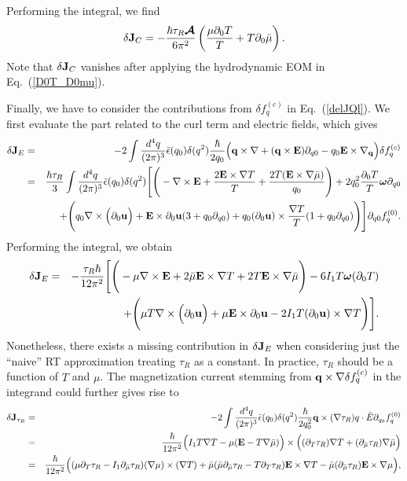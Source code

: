 \documentclass[aps,prd,showkeys,preprint,amsmath,amssymb,nofootinbib]{revtex4-1}
\begin{document}
Performing the integral, we find
\begin{eqnarray}
\delta {\bf J}_{C}=-\frac{\hbar\tau_R\bm{\mathcal{A}}}{6\pi^2}\left(\frac{\mu\partial_0T}{T}+T\partial_0\bar{\mu}\right).
\end{eqnarray}
Note that $\delta {\bf J}_{C}$ vanishes after applying the hydrodynamic EOM in Eq.~(\ref{D0T_D0mu}).

Finally, we have to consider the contributions from $\delta f^{(c)}_q$ in Eq.~(\ref{delJQl}). We first evaluate the part related to the curl term and electric fields, which gives 
\begin{eqnarray}\nonumber
\delta {\bf J}_E
&=&-2\int\frac{d^4q}{(2\pi)^3}\bar{\epsilon}(q_0)\delta(q^2)\frac{\hbar}{2q_0}\Big({\bf q}\times\nabla+({\bf q\times E})\partial_{q0}-q_0{\bf E}\times\nabla_{\bf q}\Big)\delta f^{(c)}_q
\\\nonumber
&=&\frac{\hbar\tau_R}{3}\int\frac{d^4q}{(2\pi)^3}\bar{\epsilon}(q_0)\delta(q^2)
\Bigg[
\Bigg(-\nabla\times{\bf E}+\frac{2{\bf E}\times\nabla T}{T}+\frac{2T({\bf E}\times\nabla\bar{\mu})}{q_0}\Bigg)
+2q_0^2\frac{\partial_0T}{T}\bm{\omega}\partial_{q0}
\\
&&
+\Bigg(q_0\nabla\times\Big(\partial_0{\bf u}\Big)+{\bf E}\times\partial_0{\bf u}(3+q_0\partial_{q0})
+q_0(\partial_0{\bf u})\times\frac{\nabla T}{T}(1+q_0\partial_{q0})
\Bigg)
\Bigg]\partial_{q0}f^{(0)}_q.
\end{eqnarray}
Performing the integral, we obtain 
\begin{eqnarray}\nonumber
\delta {\bf J}_E&=&-\frac{\tau_R\hbar}{12\pi^2}\Bigg[
\Bigg(-\mu\nabla\times{\bf E}+2\bar{\mu}{\bf E}\times\nabla T+2T{\bf E}\times\nabla\bar{\mu}\Bigg)
-6I_1T\bm{\omega}(\partial_0T)
\\
&&
+\Bigg(\mu T\nabla\times\Big(\partial_0{\bf u}\Big)
+\mu {\bf E}\times\partial_0{\bf u}
-2I_1T(\partial_0{\bf u})\times\nabla T
\Bigg)
\Bigg].
\end{eqnarray}
Nonetheless, there exists a missing contribution in $\delta {\bf J}_E$ when considering just the ``naive'' RT approximation treating $\tau_R$ as a constant. In practice, $\tau_R$ should be a function of $T$ and $\mu$. The magnetization current stemming from ${\bf q}\times \nabla\delta f^{(c)}_q$ in the integrand could further gives rise to
\begin{eqnarray}\nonumber\label{delJ_tauR}
\delta {\bf J}_{\tau_R}&=&-2\int\frac{d^4q}{(2\pi)^3}\bar{\epsilon}(q_0)\delta(q^2)\frac{\hbar}{2q_0^2}{\bf q}\times(\nabla\tau_R)q\cdot\tilde{E}\partial_{q_0}f^{(0)}_q
\\\nonumber
&=&\frac{\hbar}{12\pi^2}\Big(I_1T\nabla T-\mu({\bf E}-T\nabla\bar{\mu})\Big)\times
\Big((\partial_T\tau_R)\nabla T+(\partial_{\bar{\mu}}\tau_R)\nabla\bar{\mu}\Big)
\\\nonumber
&=&\frac{\hbar}{12\pi^2}\Big((\mu\partial_T\tau_R-I_1\partial_{\bar{\mu}}\tau_R)(\nabla\mu)\times(\nabla T)+\bar{\mu}(\bar{\mu}\partial_{\bar{\mu}}\tau_R-T\partial_T\tau_R){\bf E}\times\nabla T
	-\bar{\mu}(\partial_{\bar{\mu}}\tau_R){\bf E}\times\nabla\mu
	\Big),
\\
\end{eqnarray}
\end{document}
